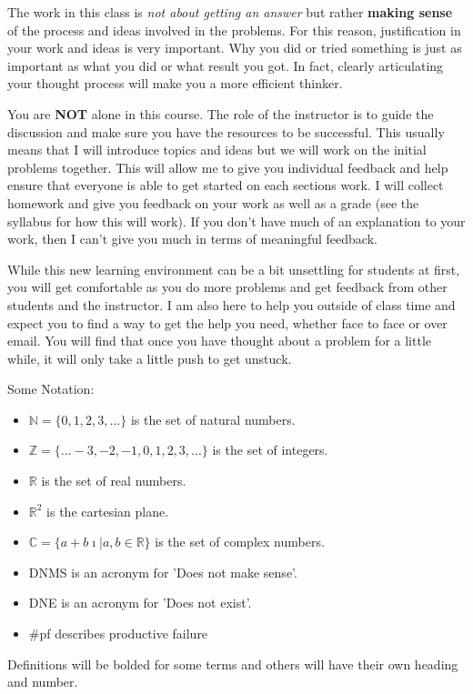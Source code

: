 The work in this class is \emph{not about getting an answer} but rather \textbf{making sense} of the process and ideas involved in the problems. For this reason, justification in your work and ideas is very important. Why you did or tried something is just as important as what you did or what result you got. In fact, clearly articulating your thought process will make you a more efficient thinker.

You are \textbf{NOT} alone in this course. The role of the instructor is to guide the discussion and make sure you have the resources to be successful. This usually means that I will introduce topics and ideas but we will work on the initial problems together. This will allow me to give you individual feedback and help ensure that everyone is able to get started on each sections work. I will collect homework and give you feedback on your work as well as a grade (see the syllabus for how this will work). If you don't have much of an explanation to your work, then I can't give you much in terms of meaningful feedback.

While this new learning environment can be a bit unsettling for students at first, you will get comfortable as you do more problems and get feedback from other students and the instructor. I am also here to help you outside of class time and expect you to find a way to get the help you need, whether face to face or over email. You will find that once you have thought about a problem for a little while, it will only take a little push to get unstuck.

Some Notation:
\begin{itemize}
\item $\mathbb{N}=\{0,1,2,3,...\}$ is the set of natural numbers.
\item $\mathbb{Z}=\{...-3,-2,-1,0,1,2,3,...\}$ is the set of integers.
\item $\mathbb{R}$ is the set of real numbers.
\item $\mathbb{R}^2$ is the cartesian plane.
\item $\mathbb{C}=\{a+b \imath | a,b \in \mathbb{R}\}$ is the set of complex numbers.
\item DNMS is an acronym for 'Does not make sense'.
\item DNE is an acronym for 'Does not exist'.
\item \#pf describes productive failure
\end{itemize}
Definitions will be bolded for some terms and others will have their own heading and number.

